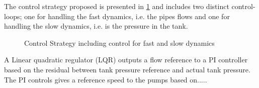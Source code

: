 The control strategy proposed is presented in \cref{fig:tikzControlStrat} and includes two distinct control-loops; one for handling the fast dynamics, i.e. the pipes flows and one for handling the slow dynamics, i.e. is the pressure in the tank.  
\begin{figure}[h!]
	\centering
	\resizebox{\columnwidth}{!}{
	}
	\caption{Control Strategy including control for fast and slow dynamics}
	\label{fig:tikzControlStrat}
\end{figure}
A Linear quadratic regulator (LQR) outputs a flow reference to a PI controller based on the residual between tank pressure reference and actual tank pressure. The PI controls gives a reference speed to the pumps based on.....
